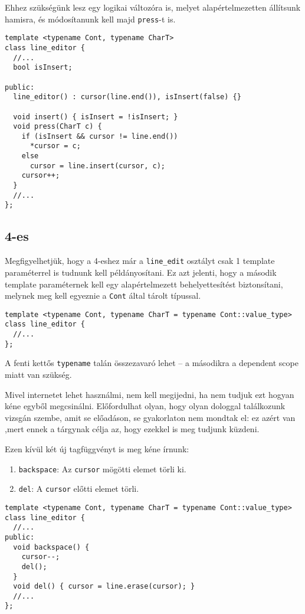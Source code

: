 \documentclass[../cpp_book/cpp_book.tex]{subfiles}
\begin{document}
	Ehhez szükségünk lesz egy logikai változóra is, melyet alapértelmezetten állítsunk hamisra, és módosítanunk kell majd \texttt{press}-t is.
\begin{lstlisting}
template <typename Cont, typename CharT>
class line_editor {
  //...
  bool isInsert;

public:
  line_editor() : cursor(line.end()), isInsert(false) {}

  void insert() { isInsert = !isInsert; }
  void press(CharT c) {
    if (isInsert && cursor != line.end())
      *cursor = c;
    else
      cursor = line.insert(cursor, c);
    cursor++;
  }
  //...
};
\end{lstlisting}
	\subsection{4-es}
	Megfigyelhetjük, hogy a 4-eshez már a \texttt{line\_edit} osztályt csak 1 template paraméterrel is tudnunk kell példányosítani. Ez azt jelenti, hogy a második template paraméternek kell egy alapértelmezett behelyettesítést biztonsítani, melynek meg kell egyeznie a \texttt{Cont} által tárolt típussal.
\begin{lstlisting}
template <typename Cont, typename CharT = typename Cont::value_type>
class line_editor {
  //...
};
\end{lstlisting}
	\begin{note}
		A fenti kettős \texttt{typename} talán összezavaró lehet -- a másodikra a dependent scope miatt van szükség.
	\end{note}
	\begin{note}
		Mivel internetet lehet használmi, nem kell megijedni, ha nem tudjuk ezt hogyan kéne egyből megcsinálni. Előfordulhat olyan, hogy olyan dologgal találkozunk vizsgán szembe, amit se előadáson, se gyakorlaton nem mondtak el: ez azért van ,mert ennek a tárgynak célja az, hogy ezekkel is meg tudjunk küzdeni.
	\end{note}
	 
	Ezen kívül két új tagfüggvényt is meg kéne írnunk:
	\begin{enumerate}
		\item \texttt{backspace}: Az \texttt{cursor} mögötti elemet törli ki.
		\item \texttt{del}: A \texttt{cursor} előtti elemet törli.
	\end{enumerate}
\begin{lstlisting}
template <typename Cont, typename CharT = typename Cont::value_type>
class line_editor {
  //...
public:
  void backspace() {
    cursor--;
    del();
  }
  void del() { cursor = line.erase(cursor); }
  //...
};
\end{lstlisting}
\end{document}
